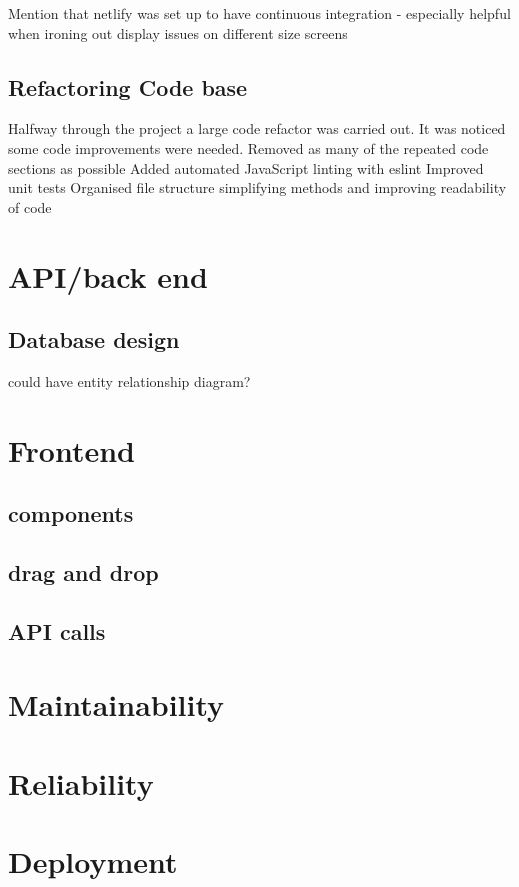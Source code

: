 \documentclass[l4proj.tex]{subfiles}
\begin{document}
Mention that netlify was set up to have continuous integration - especially helpful when ironing out display issues on different size screens

\subsection{Refactoring Code base}
Halfway through the project a large code refactor was carried out. It was noticed some code improvements were needed. 
Removed as many of the repeated code sections as possible
Added automated JavaScript linting with eslint
Improved unit tests 
Organised file structure 
simplifying methods and improving readability of code

\section{API/back end}
\subsection{Database design}
could have entity relationship diagram?

\section{Frontend}
\subsection{components}
\subsection{drag and drop}
\subsection{API calls}

\section{Maintainability}

\section{Reliability}

\section{Deployment}
\end{document}
